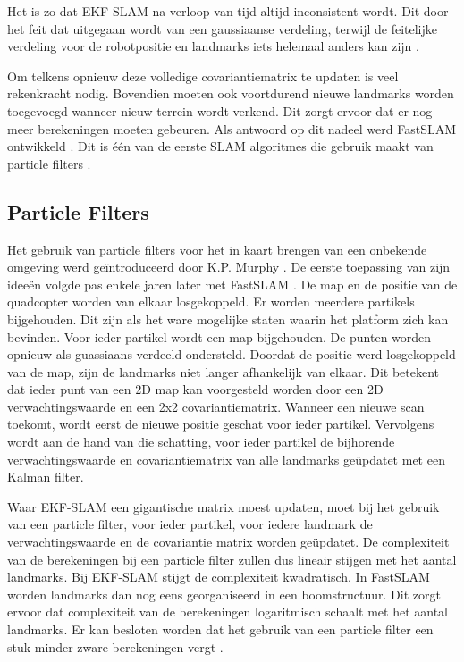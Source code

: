 \npar Het is zo dat EKF-SLAM na verloop van tijd altijd inconsistent wordt. Dit door het feit dat uitgegaan wordt van een gaussiaanse verdeling, terwijl de feitelijke verdeling voor de robotpositie en landmarks iets helemaal anders kan zijn \cite{paper:SLAMconsistency}.

\npar Om telkens opnieuw deze volledige covariantiematrix te updaten is veel rekenkracht nodig. Bovendien moeten ook voortdurend nieuwe landmarks worden toegevoegd wanneer nieuw terrein wordt verkend. Dit zorgt ervoor dat er nog meer berekeningen moeten gebeuren. Als antwoord op dit nadeel werd FastSLAM ontwikkeld \cite{paper:FastSLAM}. Dit is \'e\'en van de eerste SLAM algoritmes die gebruik maakt van particle filters \cite{paper:SLAMTutorial}.

\subsection{Particle Filters}
Het gebruik van particle filters voor het in kaart brengen van een onbekende omgeving werd ge\"introduceerd door K.P. Murphy \cite{paper:BayesianMap}. De eerste toepassing van zijn idee\"en volgde pas enkele jaren later met FastSLAM \cite{paper:FastSLAM}. De map en de positie van de quadcopter worden van elkaar losgekoppeld. Er worden meerdere partikels bijgehouden. Dit zijn als het ware mogelijke staten waarin het platform zich kan bevinden. Voor ieder partikel wordt een map bijgehouden. De punten worden opnieuw als guassiaans verdeeld ondersteld. Doordat de positie werd losgekoppeld van de map, zijn de landmarks niet langer afhankelijk van elkaar. Dit betekent dat ieder punt van een 2D map kan voorgesteld worden door een 2D verwachtingswaarde en een 2x2 covariantiematrix. Wanneer een nieuwe scan toekomt, wordt eerst de nieuwe positie geschat voor ieder partikel. Vervolgens wordt aan de hand van die schatting, voor ieder partikel de bijhorende verwachtingswaarde en covariantiematrix van alle landmarks ge\"updatet met een Kalman filter.

\npar Waar EKF-SLAM een gigantische matrix moest updaten, moet bij het gebruik van een particle filter, voor ieder partikel, voor iedere landmark de verwachtingswaarde en de covariantie matrix worden ge\"updatet. De complexiteit van de berekeningen bij een particle filter zullen dus lineair stijgen met het aantal landmarks. Bij EKF-SLAM stijgt de complexiteit kwadratisch. In FastSLAM worden landmarks dan nog eens georganiseerd in een boomstructuur. Dit zorgt ervoor dat complexiteit van de berekeningen logaritmisch schaalt met het aantal landmarks. Er kan besloten worden dat het gebruik van een particle filter een stuk minder zware berekeningen vergt \cite{paper:FastSLAM} \cite{book:SLAMHandbook}.

